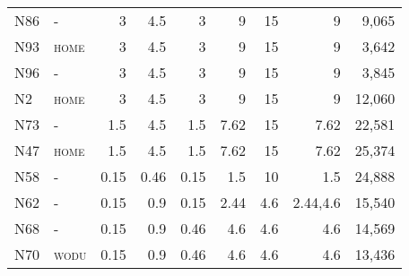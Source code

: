 {\begin{table}
\begin{threeparttable}
\begin{tabular}[l]{@{}llrrrrrrr}
N86 & -& 3 & 4.5 & 3 & 9 & 15 & 9 & 9,065 \tabularnewline
N93 & \textsc{home}& 3 & 4.5 & 3 & 9 & 15 & 9 & 3,642 \tabularnewline
N96 & -& 3 & 4.5 & 3 & 9 & 15 & 9 & 3,845 \tabularnewline
N2 & \textsc{home}& 3 & 4.5 & 3 & 9 & 15 & 9 & 12,060 \tabularnewline
N73 & -& 1.5 & 4.5 & 1.5 & 7.62 & 15 & 7.62 & 22,581 \tabularnewline
N47 & \textsc{home}& 1.5 & 4.5 & 1.5 & 7.62 & 15 & 7.62 & 25,374 \tabularnewline
N58 & -& 0.15 & 0.46 & 0.15 & 1.5 & 10 & 1.5 & 24,888 \tabularnewline
N62 & -& 0.15 & 0.9 & 0.15 & 2.44 & 4.6 & 2.44,4.6 & 15,540 \tabularnewline
N68 & -& 0.15 & 0.9 & 0.46 & 4.6 & 4.6 & 4.6 & 14,569 \tabularnewline
N70 & \textsc{wodu}& 0.15 & 0.9 & 0.46 & 4.6 & 4.6 & 4.6 & 13,436 \tabularnewline
\bottomrule
\end{tabular}
\end{threeparttable}
\end{table}
\clearpage
}